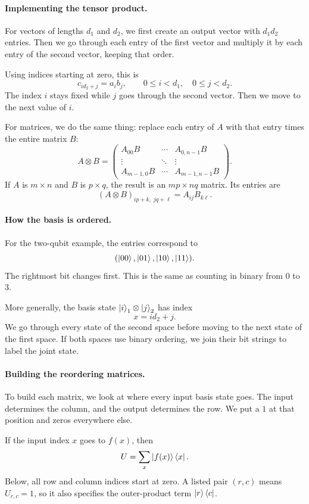 \documentclass[11pt]{article}
\begin{document}
\paragraph{Implementing the tensor product.}
For vectors of lengths $d_1$ and $d_2$, we first create
an output vector with $d_1d_2$ entries. Then we go through
each entry of the first vector and multiply it by each
entry of the second vector, keeping that order.

Using indices starting at zero, this is
\[
c_{i d_2+j}=a_i b_j,
\qquad
0\leq i<d_1,\quad 0\leq j<d_2.
\]
The index $i$ stays fixed while $j$ goes through the second
vector. Then we move to the next value of $i$.

For matrices, we do the same thing: replace each entry
of $A$ with that entry times the entire matrix $B$:
\[
A\otimes B=
\begin{pmatrix}
A_{00}B & \cdots & A_{0,n-1}B\\
\vdots & \ddots & \vdots\\
A_{m-1,0}B & \cdots & A_{m-1,n-1}B
\end{pmatrix}.
\]
If $A$ is $m\times n$ and $B$ is $p\times q$, the result
is an $mp\times nq$ matrix. Its entries are
\[
(A\otimes B)_{ip+k,\;jq+\ell}=A_{ij}B_{k\ell}.
\]

\paragraph{How the basis is ordered.}
For the two-qubit example, the entries correspond to
\[
(\ket{00},\ket{01},\ket{10},\ket{11}).
\]
The rightmost bit changes first. This is the same as
counting in binary from $0$ to $3$.

More generally, the basis state
$\ket{i}_1\otimes\ket{j}_2$ has index
\[
x=i d_2+j.
\]
We go through every state of the second space before
moving to the next state of the first space. If both
spaces use binary ordering, we join their bit strings
to label the joint state.

\paragraph{Building the reordering matrices.}
To build each matrix, we look at where every input
basis state goes. The input determines the column,
and the output determines the row. We put a $1$ at
that position and zeros everywhere else.

If the input index $x$ goes to $f(x)$, then
\[
U=\sum_x\ket{f(x)}\bra{x}.
\]
Below, all row and column indices start at zero.
A listed pair $(r,c)$ means $U_{r,c}=1$, so it also
specifies the outer-product term $\ket{r}\bra{c}$.
\end{document}
